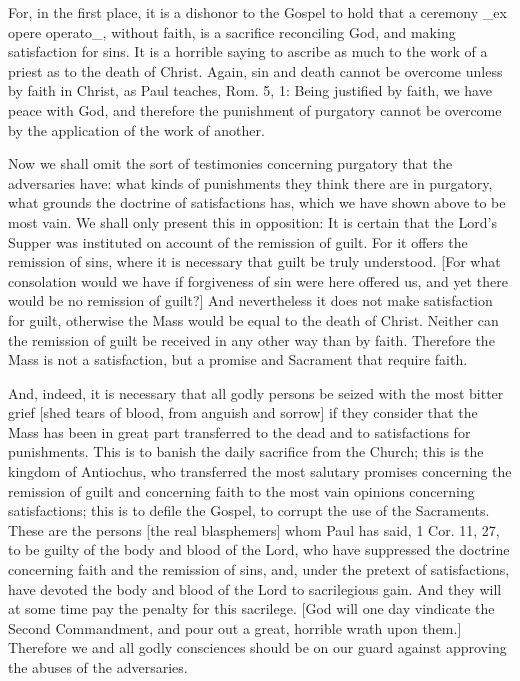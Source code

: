 For, in the first place, it is a dishonor to the Gospel to hold that
a ceremony _ex opere operato_, without faith, is a sacrifice
reconciling God, and making satisfaction for sins.  It is a horrible
saying to ascribe as much to the work of a priest as to the death of
Christ.  Again, sin and death cannot be overcome unless by faith in
Christ, as Paul teaches, Rom. 5, 1: Being justified by faith, we have
peace with God, and therefore the punishment of purgatory cannot be
overcome by the application of the work of another.

Now we shall omit the sort of testimonies concerning purgatory that
the adversaries have: what kinds of punishments they think there are
in purgatory, what grounds the doctrine of satisfactions has, which
we have shown above to be most vain.  We shall only present this in
opposition: It is certain that the Lord's Supper was instituted on
account of the remission of guilt.  For it offers the remission of
sins, where it is necessary that guilt be truly understood.  [For
what consolation would we have if forgiveness of sin were here
offered us, and yet there would be no remission of guilt?] And
nevertheless it does not make satisfaction for guilt, otherwise the
Mass would be equal to the death of Christ.  Neither can the
remission of guilt be received in any other way than by faith.
Therefore the Mass is not a satisfaction, but a promise and Sacrament
that require faith.

And, indeed, it is necessary that all godly persons be seized with
the most bitter grief [shed tears of blood, from anguish and sorrow]
if they consider that the Mass has been in great part transferred to
the dead and to satisfactions for punishments.  This is to banish the
daily sacrifice from the Church; this is the kingdom of Antiochus,
who transferred the most salutary promises concerning the remission
of guilt and concerning faith to the most vain opinions concerning
satisfactions; this is to defile the Gospel, to corrupt the use of
the Sacraments.  These are the persons [the real blasphemers] whom
Paul has said, 1 Cor. 11, 27, to be guilty of the body and blood of
the Lord, who have suppressed the doctrine concerning faith and the
remission of sins, and, under the pretext of satisfactions, have
devoted the body and blood of the Lord to sacrilegious gain.  And
they will at some time pay the penalty for this sacrilege.  [God will
one day vindicate the Second Commandment, and pour out a great,
horrible wrath upon them.] Therefore we and all godly consciences
should be on our guard against approving the abuses of the
adversaries.

